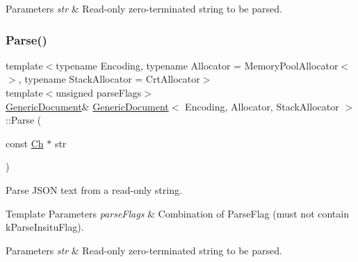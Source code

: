 \begin{DoxyParams}{Parameters}
{\em str} & Read-\/only zero-\/terminated string to be parsed. \\
\hline
\end{DoxyParams}
\mbox{\label{classGenericDocument_a5e377f840009b5cee6757be29525ce0b}} 
\subsubsection{\texorpdfstring{Parse()}{Parse()}\hspace{0.1cm}{\footnotesize\ttfamily [2/6]}}
{\footnotesize\ttfamily template$<$typename Encoding, typename Allocator = Memory\+Pool\+Allocator$<$$>$, typename Stack\+Allocator = Crt\+Allocator$>$ \\
template$<$unsigned parse\+Flags$>$ \\
\hyperlink{classGenericDocument}{Generic\+Document}\& \hyperlink{classGenericDocument}{Generic\+Document}$<$ Encoding, Allocator, Stack\+Allocator $>$\+::Parse (\begin{DoxyParamCaption}\item[{const \hyperlink{classGenericValue_ade0e0ce64ccd5d852da57a35e720bafb}{Ch} $\ast$}]{str }\end{DoxyParamCaption})\hspace{0.3cm}{\ttfamily [inline]}}



Parse J\+S\+ON text from a read-\/only string. 


\begin{DoxyTemplParams}{Template Parameters}
{\em parse\+Flags} & Combination of Parse\+Flag (must not contain k\+Parse\+Insitu\+Flag). \\
\hline
\end{DoxyTemplParams}

\begin{DoxyParams}{Parameters}
{\em str} & Read-\/only zero-\/terminated string to be parsed. \\
\hline
\end{DoxyParams}
\mbox{\label{classGenericDocument_a49ae6de6fd0bc820d9864a106c10b4da}} 
